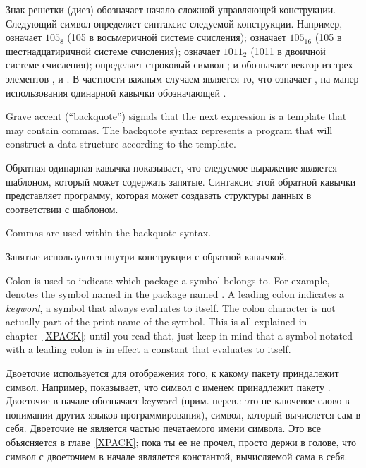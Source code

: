 \begin{indentdesc}{1.2pc}
\item[\cd{\#}] Знак решетки (диез) обозначает начало сложной управляющей
конструкции. Следующий символ определяет синтаксис следуемой конструкции.
Например,  означает $105_{8}$ (105 в восьмеричной системе счисления);
 означает $105_{16}$ (105 в шестнадцатиричной системе счисления);
 означает $1011_{2}$ (1011 в двоичной системе счисления);
 определяет строковый символ ; и 
обозначает вектор из трех элементов ,  и . В частности важным
случаем является то, что  означает , на
манер использования одинарной кавычки  обозначающей .

\item[\cd{{\Xbq}}] Grave accent (``backquote'') signals that
the next expression is a template that may contain commas.  The backquote syntax
represents a program that will construct a data structure
according to the template.

\item[\cd{{\Xbq}}] Обратная одинарная кавычка показывает, что следуемое
выражение является шаблоном, который может содержать запятые. Синтаксис этой
обратной кавычки представляет программу, которая может создавать структуры
данных в соответствии с шаблоном.

\item[\cd{,}] Commas are used within the backquote syntax.

\item[\cd{,}] Запятые используются внутри конструкции с обратной кавычкой.

\item[\cd{:}] Colon is used to indicate which package a
symbol belongs to. For example,  denotes the symbol named
 in the package named .  A leading colon indicates a {\it
keyword}, a symbol that always evaluates to itself.
The colon character is not actually part of the print name
of the symbol.
This is all explained in chapter~\ref{XPACK}; until you read
that, just keep in mind that a symbol notated with a leading colon
is in effect a constant that evaluates to itself.
\end{indentdesc}

\item[\cd{:}] Двоеточие используется для отображения того, к какому пакету
приндалежит символ. Например,  показывает, что символ с
именем  принадлежит пакету . Двоеточие в начале обозначает 
keyword (прим. перев.: это не ключевое слово в понимании других языков 
программирования), символ, который вычислется сам в себя. Двоеточие не является
частью печатаемого имени символа. 
Это все объясняется в главе~\ref{XPACK}; пока ты ее не прочел, просто держи в
голове, что символ с двоеточием в начале являлется константой, вычисляемой сама
в себя.

